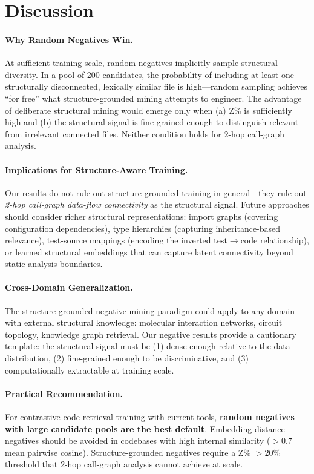 \documentclass[11pt]{article}
\begin{document}
\section{Discussion}
\label{sec:discussion}

\paragraph{Why Random Negatives Win.}
At sufficient training scale, random negatives implicitly sample structural diversity. In a pool of 200 candidates, the probability of including at least one structurally disconnected, lexically similar file is high---random sampling achieves ``for free'' what structure-grounded mining attempts to engineer. The advantage of deliberate structural mining would emerge only when (a) Z\% is sufficiently high and (b) the structural signal is fine-grained enough to distinguish relevant from irrelevant connected files. Neither condition holds for 2-hop call-graph analysis.

\paragraph{Implications for Structure-Aware Training.}
Our results do not rule out structure-grounded training in general---they rule out \emph{2-hop call-graph data-flow connectivity} as the structural signal. Future approaches should consider richer structural representations: import graphs (covering configuration dependencies), type hierarchies (capturing inheritance-based relevance), test-source mappings (encoding the inverted test$\to$code relationship), or learned structural embeddings that can capture latent connectivity beyond static analysis boundaries.

\paragraph{Cross-Domain Generalization.}
The structure-grounded negative mining paradigm could apply to any domain with external structural knowledge: molecular interaction networks, circuit topology, knowledge graph retrieval. Our negative results provide a cautionary template: the structural signal must be (1) dense enough relative to the data distribution, (2) fine-grained enough to be discriminative, and (3) computationally extractable at training scale.

\paragraph{Practical Recommendation.}
For contrastive code retrieval training with current tools, \textbf{random negatives with large candidate pools are the best default}. Embedding-distance negatives should be avoided in codebases with high internal similarity ($>0.7$ mean pairwise cosine). Structure-grounded negatives require a Z\% $> 20\%$ threshold that 2-hop call-graph analysis cannot achieve at scale.
\end{document}
